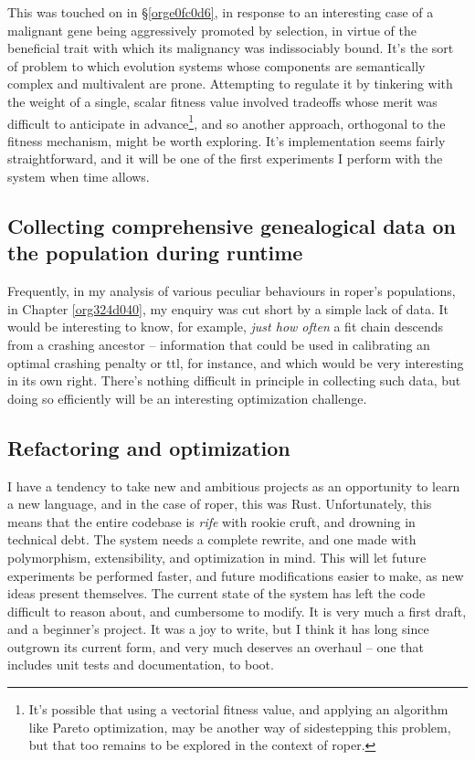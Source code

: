 \documentclass[12pt,glossary]{dalthesis}
\begin{document}
This was touched on in \S \ref{orge0fc0d6}, in response to an interesting case
of a malignant gene being aggressively promoted by selection, in virtue of the
beneficial trait with which its malignancy was indissociably bound. It's the
sort of problem to which evolution systems whose components are semantically
complex and multivalent are prone. Attempting to regulate it by tinkering with
the weight of a single, scalar fitness value involved tradeoffs whose merit was
difficult to anticipate in advance\footnote{It's possible that using a vectorial fitness value, and applying an algorithm
  like Pareto optimization, may be another way of sidestepping this problem, but
  that too remains to be explored in the context of \gls{roper}.}, and so another approach, orthogonal to the fitness mechanism, might be worth
exploring. It's implementation seems fairly straightforward, and it will be one
of the first experiments I perform with the system when time allows. 

\subsection{Collecting comprehensive genealogical data on the population during runtime}
\label{sec:org660a8c8}

Frequently, in my analysis of various peculiar behaviours in \gls{roper}'s
populations, in Chapter \ref{org324d040}, my enquiry was cut short by a simple
lack of data. It would be interesting to know, for example, \emph{just how often} a
fit chain descends from a crashing ancestor -- information that could be used in
calibrating an optimal crashing penalty or \gls{ttl}, for instance, and which would
be very interesting in its own right. There's nothing difficult in principle in
collecting such data, but doing so efficiently will be an interesting optimization
challenge. 

\subsection{Refactoring and optimization}
\label{sec:orgec52aff}

I have a tendency to take new and ambitious projects as an opportunity to learn
a new language, and in the case of \gls{roper}, this was Rust. Unfortunately, this
means that the entire codebase is \emph{rife} with rookie cruft, and drowning in 
technical debt. The system needs a complete rewrite, and one made with polymorphism,
extensibility, and optimization in mind. This will let future experiments be 
performed faster, and future modifications easier to make, as new ideas present
themselves. The current state of the system has left the code difficult to reason
about, and cumbersome to modify. It is very much a first draft, and a beginner's
project. It was a joy to write, but I think it has long since outgrown its current
form, and very much deserves an overhaul -- one that includes unit tests and
documentation, to boot. 
\end{document}
